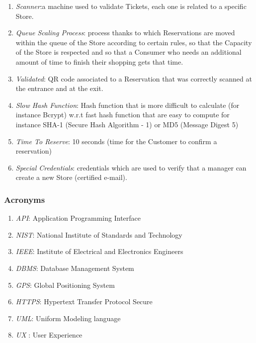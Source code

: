 \documentclass[a4paper, 12pt, oneside]{article}
\begin{document}
\begin{enumerate}[label={D.\arabic{*}}]
\item \label{def:scanner}\textit{Scanner}:a machine used to validate Tickets, each one is related to a specific Store.
\item \label{def:queuescaling}\textit{Queue Scaling Process}: process thanks to which Reservations are moved within the queue of the Store according to certain rules, so that the Capacity of the Store is respected and so that a Consumer who needs an additional amount of time to finish their shopping gets that time.
\item \label{def:validated}\textit{Validated}: QR code associated to a Reservation that was correctly scanned at the entrance and at the exit.
\item \label{def:slowHashFunction}\textit{Slow Hash Function}: Hash function that is more difficult to calculate (for instance Bcrypt) w.r.t fast hash function that are easy to compute for instance SHA-1 (Secure Hash Algorithm - 1) or MD5 (Message Digest 5)
\item \label{def:timeToReserve}\textit{Time To Reserve}: 10 seconds (time for the Customer to confirm a reservation)
\item \label{def:specialCredentials} \textit{Special Credentials}: credentials which are used to verify that a manager can create a new Store (certified e-mail).
\end{enumerate}

\subsubsection{Acronyms}
\begin{enumerate}[label={A.\arabic{*}}]
\item \label{def:API}\textit{API}: Application Programming Interface
\item \label{def:NIST}\textit{NIST}: National Institute of Standards and Technology
\item \label{def:IEEE}\textit{IEEE}: Institute of Electrical and Electronics Engineers
\item \label{def:DBMS}\textit{DBMS}: Database Management System
\item \label{def:GPS} \textit{GPS}: Global Positioning System
\item \label{def:HTTPS}\textit{HTTPS}: Hypertext Transfer Protocol Secure
\item \label{def:UML}\textit{UML}: Uniform Modeling language
\item \label{def:UX}\textit{UX} : User Experience
\end{enumerate}
\end{document}
